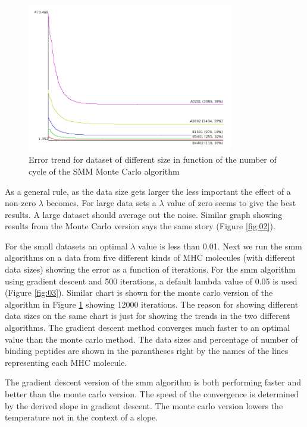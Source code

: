 \documentclass{bioinfo}
\begin{document}
\begin{application}
\begin{figure}[!tpb]
\centerline{\includegraphics[width=9cm]{fig/smm_mc_error.png}}
\caption{Error trend for dataset of different size in function of the number of cycle of the SMM Monte Carlo algorithm}
\label{fig:04}
\end{figure}

\par As a general rule, as the data size gets larger the less important the effect of a non-zero $\lambda$ becomes. For large data sets a $\lambda$ value of zero seems to give the best results. A large dataset should average out the noise. Similar graph showing results from the Monte Carlo version says the same story (Figure \ref{fig:02}).
\par For the small datasets an optimal $\lambda$ value is  less than 0.01. Next we run the smm algorithms on a data from five different kinds of MHC molecules (with different data sizes) showing the error as a function of iterations. For the smm algorithm using gradient descent and 500 iterations, a default lambda value of 0.05 is used (Figure \ref{fig:03}). Similar chart is shown for the monte carlo version of the algorithm in Figure \ref{fig:04} showing 12000 iterations. The reason for showing different data sizes on the same chart is just for showing the trends in the two different algorithms. The gradient descent method converges much faster to an optimal value than the monte carlo method. The data sizes and percentage of number of binding peptides are shown in the parantheses right by the names of the lines representing each MHC molecule.

\par The gradient descent version of the smm algorithm is both performing faster and better than the monte carlo version. The speed of the convergence is determined by the derived slope in gradient descent. The monte carlo version lowers the temperature not in the context of a slope.












%
%
%
%
%






\end{application}
\end{document}
